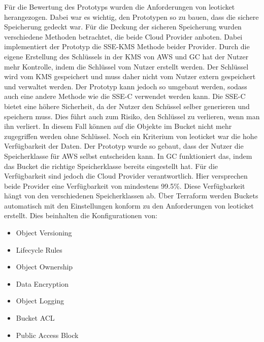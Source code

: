 Für die Bewertung des Prototyps wurden die Anforderungen von leoticket herangezogen. Dabei war es wichtig, den Prototypen so zu bauen, dass die sichere Speicherung gedeckt war. Für die Deckung der sicheren Speicherung wurden verschiedene Methoden betrachtet, die beide Cloud Provider anboten. Dabei implementiert der Prototyp die SSE-KMS Methode beider Provider. Durch die eigene Erstellung des Schlüssels in der KMS von AWS und GC hat der Nutzer mehr Kontrolle, indem die Schlüssel vom Nutzer erstellt werden. Der Schlüssel wird vom KMS gespeichert und muss daher nicht vom Nutzer extern gespeichert und verwaltet werden. Der Prototyp kann jedoch so umgebaut werden, sodass auch eine andere Methode wie die SSE-C verwendet werden kann. Die SSE-C bietet eine höhere Sicherheit, da der Nutzer den Schüssel selber generieren und speichern muss. Dies führt auch zum Risiko, den Schlüssel zu verlieren, wenn man ihn verliert. In diesem Fall können auf die Objekte im Bucket nicht mehr zugegriffen werden ohne Schlüssel. Noch ein Kriterium von leoticket war die hohe Verfügbarkeit der Daten. Der Prototyp wurde so gebaut, dass der Nutzer die Speicherklasse für AWS selbst entscheiden kann. In GC funktioniert das, indem das Bucket die richtige Speicherklasse bereits eingestellt hat. Für die Verfügbarkeit sind jedoch die Cloud Provider verantwortlich. Hier versprechen beide Provider eine Verfügbarkeit von mindestens 99.5\%. Diese Verfügbarkeit hängt von den verschiedenen Speicherklassen ab. Über Terraform werden Buckets automatisch mit den Einstellungen konform zu den Anforderungen von leoticket erstellt. Dies beinhalten die Konfigurationen von:

\begin{itemize}
	\item Object Versioning
	\item Lifecycle Rules
	\item Object Ownership
	\item Data Encryption
	\item Object Logging
	\item Bucket ACL
	\item Public Access Block
\end{itemize}

